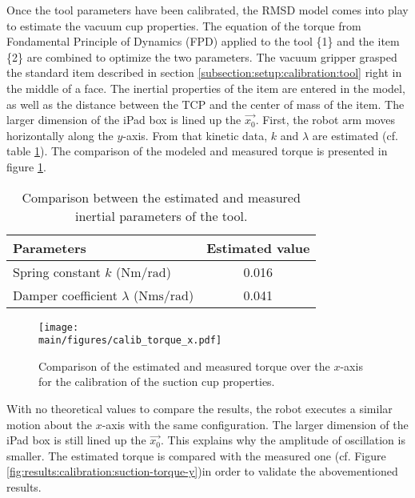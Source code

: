 \documentclass[/home/francois/latex/report/main.tex]{subfiles}
\begin{document}
Once the tool parameters have been calibrated, the \ac{RMSD} model comes into play to estimate the vacuum cup properties. The equation of the torque from Fondamental Principle of Dynamics (FPD) applied to the tool \{1\} and the item \{2\} are combined to optimize the two parameters. The vacuum gripper grasped the standard item described in section \ref{subsection:setup:calibration:tool} right in the middle of a face. The inertial properties of the item are entered in the model, as well as the distance between the \ac{TCP} and the center of mass of the item. The larger dimension of the iPad box is lined up the $\overrightarrow{x_0}$. First, the robot arm moves horizontally along the $y$-axis. From that kinetic data, $k$ and $\lambda$ are estimated (cf. table \ref{tab:results:calibration-cup}). The comparison of the modeled and measured torque is presented in figure \ref{fig:results:calibration:suction-torque-x}.

\begin{table}[h]
  \begin{center}
    \renewcommand{\arraystretch}{1.2} %
    \begin{tabular}{l|c} %
      \textbf{Parameters} & \textbf{Estimated value} \\
      \hline
      Spring constant $k$ ($\si{\newton\meter\per\radian}$) & 0.016\\
      \hline
      Damper coefficient $\lambda$ ($\si{\newton\meter\second\per\radian}$) & 0.041 \\
      \hline
    \end{tabular}
  \end{center}
  \caption{Comparison between the estimated and measured inertial parameters of the tool.\label{tab:results:calibration-cup}}
\end{table}

\begin{figure}[h]
  \centering
  \texttt{[image: \\main/figures/calib\_torque\_x.pdf]}
  \caption{Comparison of the estimated and measured torque over the $x$-axis for the calibration of the suction cup properties.}
  \label{fig:results:calibration:suction-torque-x}
\end{figure}

With no theoretical values to compare the results, the robot executes a similar motion about the $x$-axis with the same configuration. The larger dimension of the iPad box is still lined up the $\overrightarrow{x_0}$. This explains why the amplitude of oscillation is smaller. The estimated torque is compared with the measured one (cf. Figure \ref{fig:results:calibration:suction-torque-y})in order to validate the abovementioned results.
\end{document}
